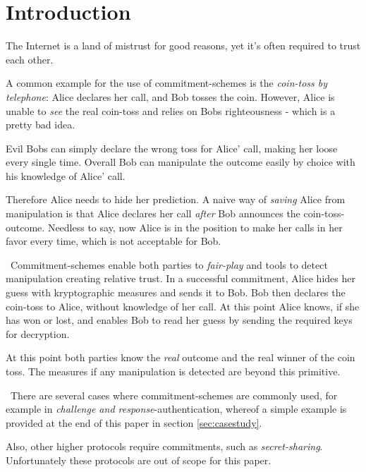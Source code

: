 \section{Introduction}
The Internet is a land of mistrust for good reasons, yet it's often required to trust each other. 

A common example for the use of commitment-schemes is the \textit{coin-toss by telephone}: Alice declares her call, and Bob tosses the coin. However, Alice is unable to \textit{see} the real coin-toss and relies on Bobs righteousness - which is a pretty bad idea. 

Evil Bobs can simply declare the wrong toss for Alice' call, making her loose every single time. Overall Bob can manipulate the outcome easily by choice with his knowledge of Alice' call. 

Therefore Alice needs to hide her prediction. A naive way of \textit{saving} Alice from manipulation is that Alice declares her call \textit{after} Bob announces the coin-toss-outcome. Needless to say, now Alice is in the position to make her calls in her favor every time, which is not acceptable for Bob. 

~\newline Commitment-schemes enable both parties to \textit{fair-play} and tools to detect manipulation creating relative trust. In a successful commitment, Alice hides her guess with kryptographic measures and sends it to Bob. Bob then declares the coin-toss to Alice, without knowledge of her call. At this point Alice knows, if she has won or lost, and enables Bob to read her guess by sending the required keys for decryption.

At this point both parties know the \textit{real} outcome and the real winner of the coin toss. The measures if any manipulation is detected are beyond this primitive.

~\newline There are several cases where commitment-schemes are commonly used, for example in \textit{challenge and response}-authentication, whereof a simple example is provided at the end of this paper in section \ref{sec:casestudy}.

Also, other higher protocols require commitments, such as \textit{secret-sharing}. Unfortunately these protocols are out of scope for this paper. 

